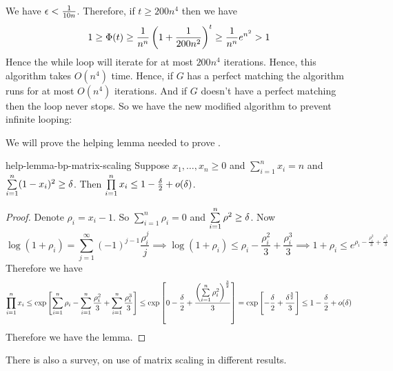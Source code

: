 We have $\epsilon<\frac1{10n}$. Therefore, if $t\geq 200n^4$ then we have $$1\geq \Phi(t)\geq \frac1{n^n}\left(1+\frac1{200n^2}\right)^t\geq \frac1{n^n}e^{n^2}>1$$Hence the while loop will iterate for at most $200n^4$ iterations. Hence, this algorithm takes $O(n^4)$ time. Hence, if $G$ has a perfect matching the algorithm runs for at most $O(n^4)$ iterations. And if $G$ doesn't have a perfect matching then the loop never stops. So we have the new modified algorithm to prevent infinite looping:

\begin{algorithm}
	\DontPrintSemicolon
	\caption{}
\end{algorithm} We will prove the helping lemma needed to prove .

\begin{lemma}{}{help-lemma-bp-matrix-scaling}
	Suppose $x_1,\dots, x_n\geq 0$ and $\sum\limits_{i=1}^n x_i=n$ and $\sum\limits_{i=1}^n (1-x_i)^2\geq \delta$. Then $\prod\limits_{i=1}^n x_i\leq 1-\frac{\delta}2+o(\delta)$.
\end{lemma}
\begin{proof}
	Denote $\rho_i=x_i-1$. So $\sum\limits_{i=1}^n \rho_i=0$ and $\sum\limits_{i=1}^n \rho^2\geq \delta$. Now $$\log(1+\rho_i)=\sum_{j=1}^{\infty}(-1)^{j-1}\frac{\rho_i^j}{j}\implies \log(1+\rho_i)\leq \rho_i-\frac{\rho_i^2}3+\frac{\rho_i^3}3\implies 1+\rho_i\leq e^{\rho_i-\frac{\rho_i^2}3+\frac{\rho_i^3}3}$$Therefore we have $$\prod_{i=1}^n x_i\leq \exp\left[\sum_{i=1}^n \rho_i-\sum_{i=1}^n\frac{\rho_i^2}3+\sum_{i=1}^n\frac{\rho_i^3}3\right]\leq \exp\left[0-\frac{\delta}2+\frac{\left(\sum\limits_{i=1}^n\rho_i^2\right)^{\frac32} }3  \right]=\exp\left[-\frac{\delta}2+\frac{\delta^{\frac32}}3  \right]\leq 1-\frac{\delta}2+o(\delta)$$Therefore we have the lemma.
\end{proof}

There is also a survey, \cite{Idel_2016_Aro} on use of matrix scaling in different results.

